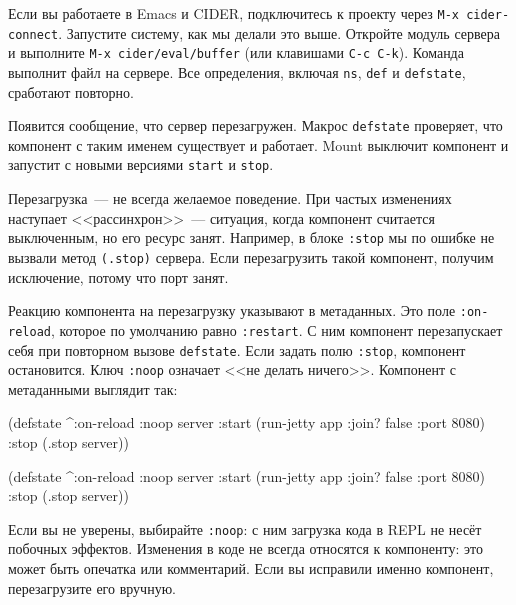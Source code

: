
Если вы работаете в Emacs и CIDER, подключитесь к проекту через
\verb|M-x cider-connect|. Запустите систему, как мы делали это выше.
Откройте модуль сервера и выполните \texttt{M-x~cider\-/eval\-/buffer}
(или клавишами \verb|C-c C-k|). Команда выполнит файл на сервере.
Все определения, включая \verb|ns|, \verb|def| и \verb|defstate|,
сработают повторно.

Появится сообщение, что сервер перезагружен. Макрос \texttt{def\-state} проверяет,
что компонент с таким именем существует и работает. Mount выключит компонент и
запустит с новыми версиями \verb|start| и \verb|stop|.

Перезагрузка~--- не всегда желаемое поведение. При частых изменениях наступает
<<рассинхрон>>~--- ситуация, когда компонент считается выключенным, но его
ресурс занят. Например, в блоке \verb|:stop| мы по ошибке не вызвали метод
\verb|(.stop)| сервера. Если перезагрузить такой компонент, получим исключение,
потому что порт занят.

Реакцию компонента на перезагрузку указывают в метаданных. Это поле
\verb|:on-reload|, которое по умолчанию равно \verb|:restart|. С ним компонент
перезапускает себя при повторном вызове \verb|defstate|. Если задать полю
\verb|:stop|, компонент остановится. Ключ \verb|:noop| означает <<не делать
ничего>>. Компонент с метаданными выглядит так:

\pagebreaklarge

\ifnarrow

\begin{english}
  \begin{clojure}
(defstate
  ^{:on-reload :noop}
  server
  :start (run-jetty app
           {:join? false :port 8080})
  :stop (.stop server))
  \end{clojure}
\end{english}

\else

\begin{english}
  \begin{clojure}
(defstate
  ^{:on-reload :noop}
  server
  :start (run-jetty app {:join? false :port 8080})
  :stop (.stop server))
  \end{clojure}
\end{english}

\fi

Если вы не уверены, выбирайте \verb|:noop|: с ним загрузка кода в REPL не несёт
побочных эффектов. Изменения в коде не всегда относятся к компоненту: это может
быть опечатка или комментарий. Если вы исправили именно компонент, перезагрузите
его вручную.

